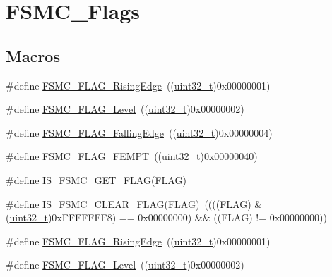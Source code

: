 \hypertarget{group___f_s_m_c___flags}{}\section{F\+S\+M\+C\+\_\+\+Flags}
\label{group___f_s_m_c___flags}
\subsection*{Macros}
\begin{DoxyCompactItemize}
\item 
\#define \hyperlink{group___f_s_m_c___flags_ga5aadbd5d9f1b6a25bcc1fc6f3bf4c9cc}{F\+S\+M\+C\+\_\+\+F\+L\+A\+G\+\_\+\+Rising\+Edge}~((\hyperlink{_p_e___types_8h_a33594304e786b158f3fb30289278f5af}{uint32\+\_\+t})0x00000001)
\item 
\#define \hyperlink{group___f_s_m_c___flags_ga25868d35780998a52190c424ebb3823f}{F\+S\+M\+C\+\_\+\+F\+L\+A\+G\+\_\+\+Level}~((\hyperlink{_p_e___types_8h_a33594304e786b158f3fb30289278f5af}{uint32\+\_\+t})0x00000002)
\item 
\#define \hyperlink{group___f_s_m_c___flags_gaaaa85bce06ed962874686ad7af0f0cb7}{F\+S\+M\+C\+\_\+\+F\+L\+A\+G\+\_\+\+Falling\+Edge}~((\hyperlink{_p_e___types_8h_a33594304e786b158f3fb30289278f5af}{uint32\+\_\+t})0x00000004)
\item 
\#define \hyperlink{group___f_s_m_c___flags_ga8da2bd0b9d11877aaebaba0c77e8b0cc}{F\+S\+M\+C\+\_\+\+F\+L\+A\+G\+\_\+\+F\+E\+M\+PT}~((\hyperlink{_p_e___types_8h_a33594304e786b158f3fb30289278f5af}{uint32\+\_\+t})0x00000040)
\item 
\#define \hyperlink{group___f_s_m_c___flags_gab8674160ef7884f939e07041bbf5b18b}{I\+S\+\_\+\+F\+S\+M\+C\+\_\+\+G\+E\+T\+\_\+\+F\+L\+AG}(F\+L\+AG)
\item 
\#define \hyperlink{group___f_s_m_c___flags_ga1114bf56b54e726831b38fc8c5daa14e}{I\+S\+\_\+\+F\+S\+M\+C\+\_\+\+C\+L\+E\+A\+R\+\_\+\+F\+L\+AG}(F\+L\+AG)~((((F\+L\+AG) \& (\hyperlink{_p_e___types_8h_a33594304e786b158f3fb30289278f5af}{uint32\+\_\+t})0x\+F\+F\+F\+F\+F\+F\+F8) == 0x00000000) \&\& ((\+F\+L\+A\+G) != 0x00000000))
\item 
\#define \hyperlink{group___f_s_m_c___flags_ga5aadbd5d9f1b6a25bcc1fc6f3bf4c9cc}{F\+S\+M\+C\+\_\+\+F\+L\+A\+G\+\_\+\+Rising\+Edge}~((\hyperlink{_p_e___types_8h_a33594304e786b158f3fb30289278f5af}{uint32\+\_\+t})0x00000001)
\item 
\#define \hyperlink{group___f_s_m_c___flags_ga25868d35780998a52190c424ebb3823f}{F\+S\+M\+C\+\_\+\+F\+L\+A\+G\+\_\+\+Level}~((\hyperlink{_p_e___types_8h_a33594304e786b158f3fb30289278f5af}{uint32\+\_\+t})0x00000002)

\end{DoxyCompactItemize}
